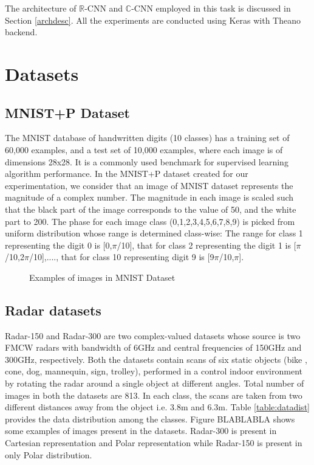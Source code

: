  The architecture of $\mathbb{R}$-CNN and $\mathbb{C}$-CNN employed in this task is discussed in Section \ref{archdesc}.  All the experiments are conducted using Keras \cite{chollet2015keras} with Theano \cite{theano} backend.
 
 
 \section{Datasets}\label{datasets}
 
 
 \subsection{MNIST+P Dataset}\label{data-mnistp}
 The MNIST database of handwritten digits (10 classes) has a training set of 60,000 examples, and a test set of 10,000 examples, where each image is of dimensions 28x28. It is a commonly used benchmark for supervised learning algorithm performance. In the MNIST+P dataset created for our experimentation, we consider that an image of MNIST dataset represents the magnitude of a complex number. The magnitude in each image is scaled such that the black part of the image corresponds to the value of 50, and the white part to 200. The phase for each image class (0,1,2,3,4,5,6,7,8,9) is picked from uniform distribution whose range is determined class-wise: The range for class 1 representing the digit 0 is [0,$\pi$/10], that for class 2 representing the digit 1 is [$\pi$/10,2$\pi$/10],...., that for class 10 representing digit 9 is [9$\pi$/10,$\pi$]. 
 
 \begin{figure}[htb]
 	\centering
 	\epsfxsize=7cm
 	{}\caption{Examples of images in MNIST Dataset \cite{mnistimage}}
 	\label{fig:blocks}
 \end{figure}
 
 \subsection{Radar datasets}\label{data-radar}
 
 Radar-150 and Radar-300 are two complex-valued datasets whose source is two FMCW radars with bandwidth of 6GHz and central frequencies of 150GHz and 300GHz, respectively.
 Both the datasets contain scans of six static objects (bike , cone, dog, mannequin, sign, trolley), performed in a control indoor environment by rotating the radar around a single object at different angles. Total number of images in both the datasets are 813. In each class, the scans are taken from two different distances away from the object i.e. 3.8m and 6.3m. Table \ref{table:datadist} provides the data distribution among the classes. Figure BLABLABLA shows some examples of images present in the datasets. Radar-300 is present in Cartesian representation and Polar representation while Radar-150 is present in only Polar distribution. 
 
